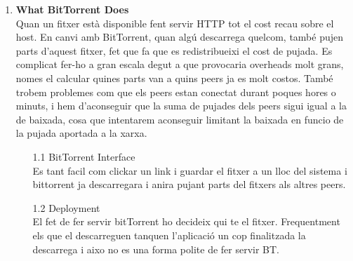 \documentclass[a4paper, 10pt]{article}
\begin{document}
\begin{enumerate}
    \item \textbf{What BitTorrent Does}\\
    Quan un fitxer està disponible fent servir HTTP tot el cost recau sobre el host. En canvi amb BitTorrent, quan algú descarrega quelcom, també pujen parts d'aquest fitxer, fet que fa que es redistribueixi el cost de pujada.
    Es complicat fer-ho a gran escala degut a que provocaria overheads molt grans, nomes el calcular quines parts van a quins peers ja es molt costos. També trobem problemes com que els peers estan conectat durant poques hores o minuts, i hem d'aconseguir que la suma de pujades dels peers sigui igual a la de baixada, cosa que intentarem aconseguir limitant la baixada en funcio de la pujada aportada a la xarxa.
    \begin{enumerate}
        \item[1.1] BitTorrent Interface \\
        Es tant facil com clickar un link i guardar el fitxer a un lloc del sistema i bittorrent ja descarregara i anira pujant parts del fitxers als altres peers.
        \item[1.2] Deployment \\
        El fet de fer servir bitTorrent ho decideix qui te el fitxer. Frequentment els que el descarreguen tanquen l'aplicació un cop finalitzada la descarrega i aixo no es una forma polite de fer servir BT.
    \end{enumerate}
    

\end{enumerate}
\end{document}
